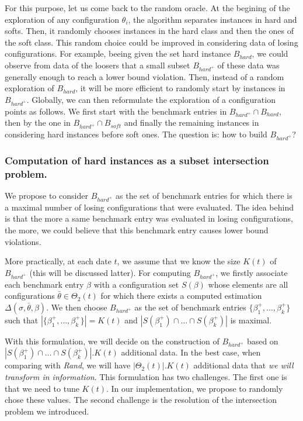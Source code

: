 \documentclass[10pt, conference, compsocconf]{IEEEtran}
\begin{document}
For this purpose, let us come back to the random oracle. At the
begining of the exploration of any configuration $\theta_i$, the
algorithm separates instances in hard and softs. Then, it randomly
chooses instances in the hard class and then the ones of the soft
class. This random choice could be improved in considering data of
losing configurations. For example, beeing given the set hard instance
$B_{hard}$, we could observe from data of the loosers that a small
subset $B_{hard^+}$ of these data was generally enough to reach a
lower bound violation. Then, instead of a random exploration of
$B_{hard}$, it will be more efficient to randomly start by instances
in $B_{hard^+}$.  Globally, we can then reformulate the exploration of
a configuration points as follows. We first start with the benchmark
entries in $B_{hard^+} \cap B_{hard}$, then by the one in
$B_{hard^+} \cap B_{soft}$ and finally the remaining instances in
considering hard instances before soft ones. The question is: how to
build $B_{hard^+}$?


\subsubsection{Computation of hard instances as a subset intersection problem.}

We propose to consider $B_{hard^+}$ as the set of benchmark entries
for which there is a maximal number of losing configurations that were
evaluated. The idea behind is that the more a same benchmark entry was
evaluated in losing configurations, the more, we could believe that
this benchmark entry causes lower bound violations.

More practically, at each date $t$, we assume that we know the size
$K(t)$ of $B_{hard^+}$ (this will be discussed latter).  For computing
$B_{hard^+}$, we firstly associate each benchmark entry $\beta$ with a
configuration set $S(\beta)$ whose elements are all configurations
$\bar{\theta} \in \Theta_2(t)$ for which there exists a computed
estimation $\Delta(\sigma, \bar{\theta}, \beta)$. We then choose
$B_{hard^+}$ as the set of benchmark entries
$\{ \beta^+_1, \dots, \beta^+_k \}$ such that
$|\{ \beta^+_1, \dots, \beta^+_k \}| = K(t)$ and
$|S(\beta^+_1) \cap \dots \cap S(\beta^+_k)|$ is maximal.


With this formulation, we will decide on the construction of
$B_{hard^+}$ based on
$|S(\beta^+_1) \cap \dots \cap S(\beta^+_k)|.K(t)$ additional data. In
the best case, when comparing with {\it Rand}, we will have
$|\Theta_2(t)|.K(t)$ additional data that {\it we will transform in
  information}.  This formulation has two challenges. The first one is
that we need to tune $K(t)$. In our implementation, we propose to
randomly chose these values. The second challenge is the resolution of
the intersection problem we introduced.
\end{document}
